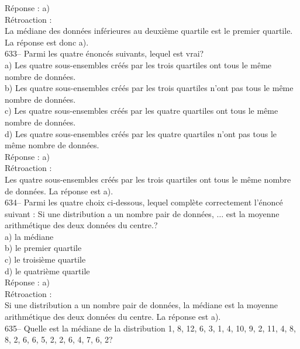 ﻿\documentclass[letterpaper, 12pt]{article}
\begin{document}
R\'eponse : a)\\

R\'etroaction : \\
La m\'ediane des donn\'ees inf\'erieures au deuxi\`eme quartile est le
premier quartile.  La r\'eponse est donc a).\\

633-- Parmi les quatre \'enonc\'es suivants, lequel est vrai?\\
a) Les quatre sous-ensembles cr\'e\'es par les trois quartiles ont tous le
m\^eme nombre de donn\'ees.  \\
b) Les quatre sous-ensembles cr\'e\'es par les trois quartiles n'ont pas
tous le m\^eme nombre de donn\'ees.  \\
c) Les quatre sous-ensembles cr\'e\'es par les quatre quartiles ont tous le
m\^eme nombre de donn\'ees.  \\
d) Les quatre sous-ensembles cr\'e\'es par les quatre quartiles n'ont pas
tous le m\^eme nombre de donn\'ees.  \\

R\'eponse : a)\\

R\'etroaction : \\
Les quatre sous-ensembles cr\'e\'es par les trois quartiles ont tous le
m\^eme nombre de donn\'ees.  La r\'eponse est a).\\

634-- Parmi les quatre choix ci-dessous, lequel compl\`ete
correctement l'\'enonc\'e suivant : \og Si une distribution a un
nombre pair de donn\'ees, $\ldots$ est la moyenne arithm\'etique des deux donn\'ees du centre.\fg?\\
a) la m\'ediane\\
b) le premier quartile\\
c) le troisi\`eme quartile\\
d) le quatri\`eme quartile\\

R\'eponse : a)\\

R\'etroaction :\\
Si une distribution a un nombre pair de donn\'ees, la m\'ediane est la
moyenne arithm\'etique des deux donn\'ees du centre.  La r\'eponse est a).
\\

635--  Quelle est la m\'ediane de la distribution 1, 8, 12, 6, 3, 1, 4, 10,
9, 2, 11, 4, 8, 8, 2, 6, 6, 5, 2, 2, 6, 4, 7, 6, 2?\\
\end{document}
